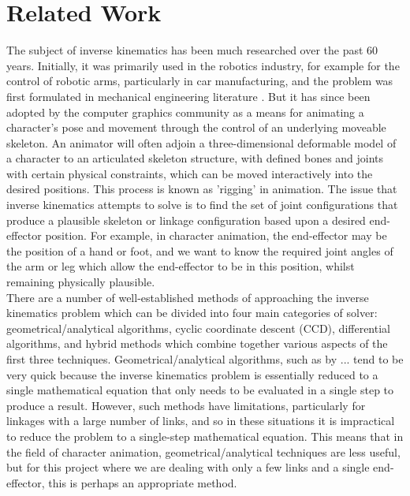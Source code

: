 \documentclass[paper=a4, fontsize=11pt]{scrartcl} %
\numberwithin{equation}{section} %
\numberwithin{figure}{section} %
\numberwithin{table}{section} %
\begin{document}

\section{Related Work}
The subject of inverse kinematics has been much researched over the past 60 years. Initially, it was primarily used in the robotics industry, for example for the control of robotic arms, particularly in car manufacturing, and the problem was first formulated in mechanical engineering literature \cite{Crai55}. But it has since been adopted by the computer graphics community as a means for animating a character's pose and movement through the control of an underlying moveable skeleton. An animator will often adjoin a three-dimensional deformable model of a character to an articulated skeleton structure, with defined bones and joints with certain physical constraints, which can be moved interactively into the desired positions. This process is known as 'rigging' in animation. The issue that inverse kinematics attempts to solve is to find the set of joint configurations that produce a plausible skeleton or linkage configuration based upon a desired end-effector position. For example, in character animation, the end-effector may be the position of a hand or foot, and we want to know the required joint angles of the arm or leg which allow the end-effector to be in this position, whilst remaining physically plausible. \\

There are a number of well-established methods of approaching the inverse kinematics problem which can be divided into four main categories of solver: geometrical/analytical algorithms, cyclic coordinate descent (CCD), differential algorithms, and hybrid methods which combine together various aspects of the first three techniques. Geometrical/analytical algorithms, such as by ... tend to be very quick because the inverse kinematics problem is essentially reduced to a single mathematical equation that only needs to be evaluated in a single step to produce a result. However, such methods have limitations, particularly for linkages with a large number of links, and so in these situations it is impractical to reduce the problem to a single-step mathematical equation. This means that in the field of character animation, geometrical/analytical techniques are less useful, but for this project where we are dealing with only a few links and a single end-effector, this is perhaps an appropriate method. \\
\end{document}
